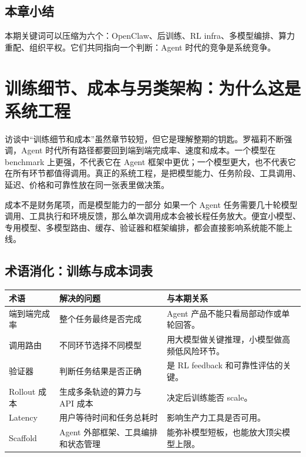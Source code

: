 \documentclass[a4paper]{article}
\begin{document}
\subsection{本章小结}

本期关键词可以压缩为六个：OpenClaw、后训练、RL infra、多模型编排、算力重配、组织平权。它们共同指向一个判断：Agent 时代的竞争是系统竞争。


\section{训练细节、成本与另类架构：为什么这是系统工程}

访谈中“训练细节和成本”虽然章节较短，但它是理解整期的钥匙。罗福莉不断强调，Agent 时代所有路径都要回到端到端完成率、速度和成本。一个模型在 benchmark 上更强，不代表它在 Agent 框架中更优；一个模型更大，也不代表它在所有环节都值得调用。真正的系统工程，是把模型能力、任务阶段、工具调用、延迟、价格和可靠性放在同一张表里做决策。

\begin{importantbox}{成本不是财务尾项，而是模型能力的一部分}
如果一个 Agent 任务需要几十轮模型调用、工具执行和环境反馈，那么单次调用成本会被长程任务放大。便宜小模型、专用模型、多模型路由、缓存、验证器和框架编排，都会直接影响系统能不能上线。
\end{importantbox}

\subsection{术语消化：训练与成本词表}

\noindent\begin{tabularx}{\textwidth}{p{}p{}X}
\toprule
术语 & 解决的问题 & 与本期关系 \\
\midrule
端到端完成率 & 整个任务最终是否完成 & Agent 产品不能只看局部动作或单轮回答。 \\
调用路由 & 不同环节选择不同模型 & 用大模型做关键推理，小模型做高频低风险环节。 \\
验证器 & 判断任务结果是否正确 & 是 RL feedback 和可靠性评估的关键。 \\
Rollout 成本 & 生成多条轨迹的算力与 API 成本 & 决定后训练能否 scale。 \\
Latency & 用户等待时间和任务总耗时 & 影响生产力工具是否可用。 \\
Scaffold & Agent 外部框架、工具编排和状态管理 & 能弥补模型短板，也能放大顶尖模型上限。 \\
\bottomrule
\end{tabularx}
\end{document}
